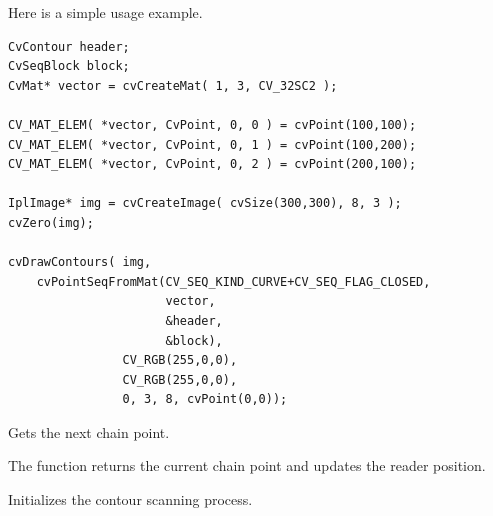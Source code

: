 Here is a simple usage example.

\begin{lstlisting}
CvContour header;
CvSeqBlock block;
CvMat* vector = cvCreateMat( 1, 3, CV_32SC2 );

CV_MAT_ELEM( *vector, CvPoint, 0, 0 ) = cvPoint(100,100);
CV_MAT_ELEM( *vector, CvPoint, 0, 1 ) = cvPoint(100,200);
CV_MAT_ELEM( *vector, CvPoint, 0, 2 ) = cvPoint(200,100);

IplImage* img = cvCreateImage( cvSize(300,300), 8, 3 );
cvZero(img);

cvDrawContours( img,
    cvPointSeqFromMat(CV_SEQ_KIND_CURVE+CV_SEQ_FLAG_CLOSED,
                      vector,
                      &header,
                      &block),
                CV_RGB(255,0,0),
                CV_RGB(255,0,0),
                0, 3, 8, cvPoint(0,0));
\end{lstlisting}


Gets the next chain point.


\begin{description}
\end{description}

The function returns the current chain point and updates the reader position.

Initializes the contour scanning process.


\begin{description}
\end{description}

